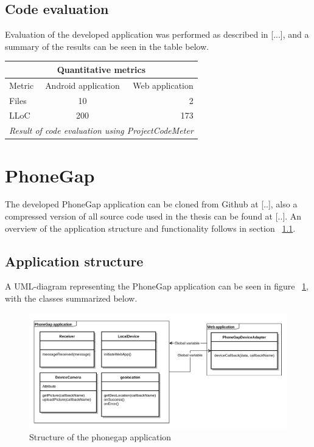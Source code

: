 \subsection{Code evaluation}
Evaluation of the developed application was performed as described in [...], and a summary of the results  can be seen in the table below.

\begin{tabular}{ | l | c | r | }
    \hline
    \multicolumn{3}{|c|}{Quantitative metrics} \\
    \hline
	Metric & Android application &  Web application \\
	\hline
	Files & 10 & 2\\
	LLoC & 200 & 173\\	
	\hline
	\multicolumn{3}{c}{\emph{Result of code evaluation using ProjectCodeMeter}}
\end{tabular}

\section{PhoneGap}
The developed PhoneGap application can be cloned from Github at [..], also a compressed version of all source code used in the thesis can be found at [..]. An overview of the application structure and functionality follows in section ~\ref{sec:phonegapstructure}. 

\subsection{Application structure} \label{sec:phonegapstructure}
A UML-diagram representing the PhoneGap application can be seen in figure ~\ref{fig:phonegapuml}, with the classes summarized below.
\begin{figure}[h!]
	\centering
    \includegraphics[width=120mm,natwidth=800,natheight=600]{./img/phonegapuml.png}
    \caption{Structure of the phonegap application}
    \label{fig:phonegapuml}
\end{figure}

